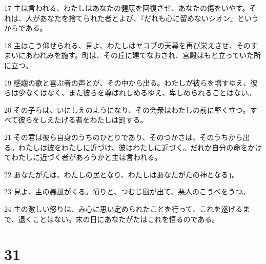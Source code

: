 \par 17 主は言われる、わたしはあなたの健康を回復させ、あなたの傷をいやす。それは、人があなたを捨てられた者とよび、『だれも心に留めないシオン』というからである。
\par 18 主はこう仰せられる、見よ、わたしはヤコブの天幕を再び栄えさせ、そのすまいにあわれみを施す。町は、その丘に建てなおされ、宮殿はもと立っていた所に立つ。
\par 19 感謝の歌と喜ぶ者の声とが、その中から出る。わたしが彼らを増すゆえ、彼らは少なくはなく、また彼らを尊ばれしめるゆえ、卑しめられることはない。
\par 20 その子らは、いにしえのようになり、その会衆はわたしの前に堅く立つ。すべて彼らをしえたげる者をわたしは罰する。
\par 21 その君は彼ら自身のうちのひとりであり、そのつかさは、そのうちから出る。わたしは彼をわたしに近づけ、彼はわたしに近づく。だれか自分の命をかけてわたしに近づく者があろうかと主は言われる。
\par 22 あなたがたは、わたしの民となり、わたしはあなたがたの神となる」。
\par 23 見よ、主の暴風がくる。憤りと、つむじ風が出て、悪人のこうべをうつ。
\par 24 主の激しい怒りは、み心に思い定められたことを行って、これを遂げるまで、退くことはない。末の日にあなたがたはこれを悟るのである。

\chapter{31}


